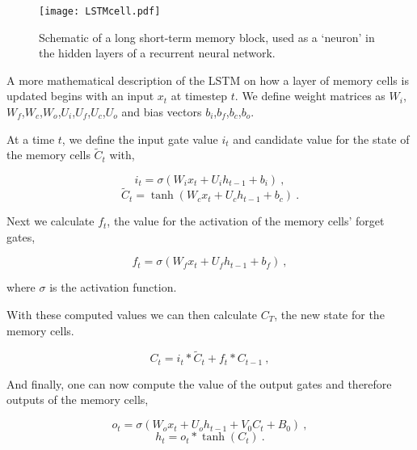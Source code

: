 
\begin{figure}[t]
    \centering
    \texttt{[image: LSTMcell.pdf]}
    \caption[LSTM cell schematic]{Schematic of a long short-term memory block, used as a `neuron' in the hidden layers of a recurrent neural network.}
    \label{fig:lstmcell}
\end{figure}

A more mathematical description of the LSTM on how a layer of memory cells is updated begins with an input $x_t$ at timestep $t$. We define weight matrices as $W_i$,$W_f$,$W_c$,$W_o$,$U_i$,$U_f$,$U_c$,$U_o$ and bias vectors $b_i$,$b_f$,$b_c$,$b_o$.

At a time $t$, we define the input gate value $i_t$ and candidate value for the state of the memory cells $\widetilde{C}_t$ with,

\begin{equation}
    i_t = \sigma(W_i x_t + U_i h_{t-1} + b_i)~,
\end{equation}
\begin{equation}
    \widetilde{C}_t = \tanh(W_c x_t + U_c h_{t-1} + b_c)~.
\end{equation}

Next we calculate $f_t$, the value for the activation of the memory cells' forget gates,

\begin{equation}
    f_t = \sigma (W_f x_t + U_f h_{t-1} +b_f)~,
\end{equation}

where $\sigma$ is the activation function.

With these computed values we can then calculate $C_T$, the new state for the memory cells.

\begin{equation}
    C_t = i_t * \widetilde{C}_t + f_t * C_{t-1}~,
\end{equation}

And finally, one can now compute the value of the output gates and therefore outputs of the memory cells,

\begin{equation}
   o_t = \sigma(W_o x_t + U_o h_{t-1} + V_0 C_t + B_0)~,
   \label{output1}
\end{equation}
\begin{equation}
    h_t = o_t * \tanh(C_t)~.
\end{equation}

